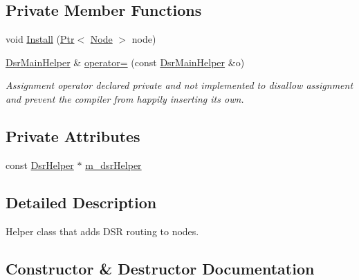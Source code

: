 \subsection*{Private Member Functions}
\begin{DoxyCompactItemize}
\item 
void \hyperlink{classns3_1_1DsrMainHelper_a48e42ffd63ee3199d504fb811c0b422e}{Install} (\hyperlink{classns3_1_1Ptr}{Ptr}$<$ \hyperlink{classns3_1_1Node}{Node} $>$ node)
\item 
\hyperlink{classns3_1_1DsrMainHelper}{Dsr\+Main\+Helper} \& \hyperlink{classns3_1_1DsrMainHelper_a2839ab2c223567c1d9bef6d87b501010}{operator=} (const \hyperlink{classns3_1_1DsrMainHelper}{Dsr\+Main\+Helper} \&o)
\begin{DoxyCompactList}\small\item\em Assignment operator declared private and not implemented to disallow assignment and prevent the compiler from happily inserting its own. \end{DoxyCompactList}\end{DoxyCompactItemize}
\subsection*{Private Attributes}
\begin{DoxyCompactItemize}
\item 
const \hyperlink{classns3_1_1DsrHelper}{Dsr\+Helper} $\ast$ \hyperlink{classns3_1_1DsrMainHelper_a39d8c73e413765e00c37d0d6f0efbddd}{m\+\_\+dsr\+Helper}
\end{DoxyCompactItemize}


\subsection{Detailed Description}
Helper class that adds D\+SR routing to nodes. 

\subsection{Constructor \& Destructor Documentation}
